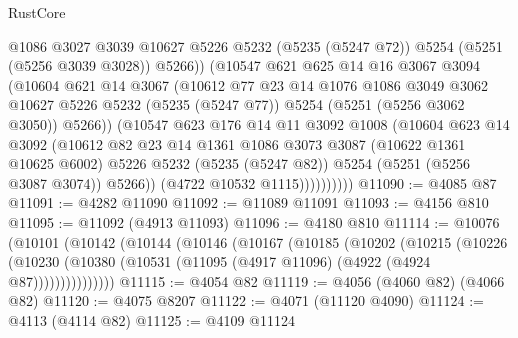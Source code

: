 \begin{lexlean}{RustCore}
\begin{coremodule}
                      @1086
                      @3027
                      @3039
                      @10627
                      @5226
                      @5232
                      (@5235 (@5247 @72))
                      @5254
                      (@5251 (@5256 @3039 @3028))
                      @5266))
                  (@10547
                    @621
                    @625
                    @14
                    @16
                    @3067
                    @3094
                    (@10604
                      @621
                      @14
                      @3067
                      (@10612
                        @77
                        @23
                        @14
                        @1076
                        @1086
                        @3049
                        @3062
                        @10627
                        @5226
                        @5232
                        (@5235 (@5247 @77))
                        @5254
                        (@5251 (@5256 @3062 @3050))
                        @5266))
                    (@10547
                      @623
                      @176
                      @14
                      @11
                      @3092
                      @1008
                      (@10604
                        @623
                        @14
                        @3092
                        (@10612
                          @82
                          @23
                          @14
                          @1361
                          @1086
                          @3073
                          @3087
                          (@10622 @1361 @10625 @6002)
                          @5226
                          @5232
                          (@5235 (@5247 @82))
                          @5254
                          (@5251 (@5256 @3087 @3074))
                          @5266))
                      (@4722 @10532 @1115))))))))))
@11090 := @4085 @87
@11091 := @4282 @11090
@11092 := @11089 @11091
@11093 := @4156 @810
@11095 := @11092 (@4913 @11093)
@11096 := @4180 @810
@11114 := @10076
    (@10101
      (@10142
        (@10144
          (@10146
            (@10167
              (@10185
                (@10202
                  (@10215
                    (@10226
                      (@10230
                        (@10380 (@10531 (@11095 (@4917 @11096) (@4922 (@4924 @87)))))))))))))))
@11115 := @4054 @82
@11119 := @4056 (@4060 @82) (@4066 @82)
@11120 := @4075 @8207
@11122 := @4071 (@11120 @4090)
@11124 := @4113 (@4114 @82)
@11125 := @4109 @11124

\end{coremodule}
\end{lexlean}

